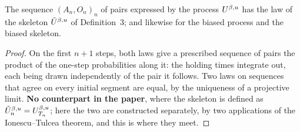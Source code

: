 \begin{lemma}
  \label{aux-jump-chain}
  \leanok
  The sequence $(A_n, O_n)_n$ of pairs expressed by the process
  $U^{\beta,u}$ has the law of the skeleton $\tilde{U}^{\beta,u}$ of Definition~3; and
  likewise for the biased process and the biased skeleton.
\end{lemma}
\begin{proof}
  \leanok
  On the first $n + 1$ steps, both laws give a prescribed sequence of pairs the
  product of the one-step probabilities along it: the holding times integrate
  out, each being drawn independently of the pair it follows.  Two laws on
  sequences that agree on every initial segment are equal, by the uniqueness of
  a projective limit.  \textbf{No counterpart in the paper}, where the skeleton
  is defined as $\tilde{U}^{\beta,u}_n = U^{\beta,u}_{T_n}$; here the two are constructed
  separately, by two applications of the Ionescu--Tulcea theorem, and this is
  where they meet.
\end{proof}

